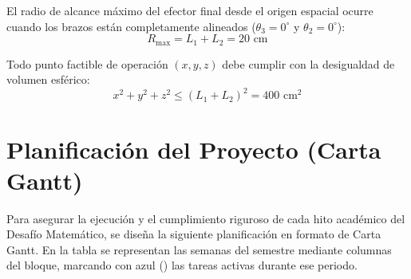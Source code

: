 \documentclass[11pt,a4paper]{article}
\begin{document}
El radio de alcance máximo del efector final desde el origen espacial ocurre cuando los brazos están completamente alineados ($\theta_3 = 0^\circ$ y $\theta_2 = 0^\circ$):
$$R_{\text{max}} = L_1 + L_2 = 20\text{ cm}$$

Todo punto factible de operación $(x,y,z)$ debe cumplir con la desigualdad de volumen esférico:
$$x^2 + y^2 + z^2 \leq (L_1 + L_2)^2 = 400\text{ cm}^2$$

\newpage

\section{Planificación del Proyecto (Carta Gantt)}

Para asegurar la ejecución y el cumplimiento riguroso de cada hito académico del Desafío Matemático, se diseña la siguiente planificación en formato de Carta Gantt. En la tabla se representan las semanas del semestre mediante columnas del bloque, marcando con azul (\colorbox{GanttBlue}{\phantom{W}}) las tareas activas durante ese periodo.

\vspace{0.5cm}
\end{document}
